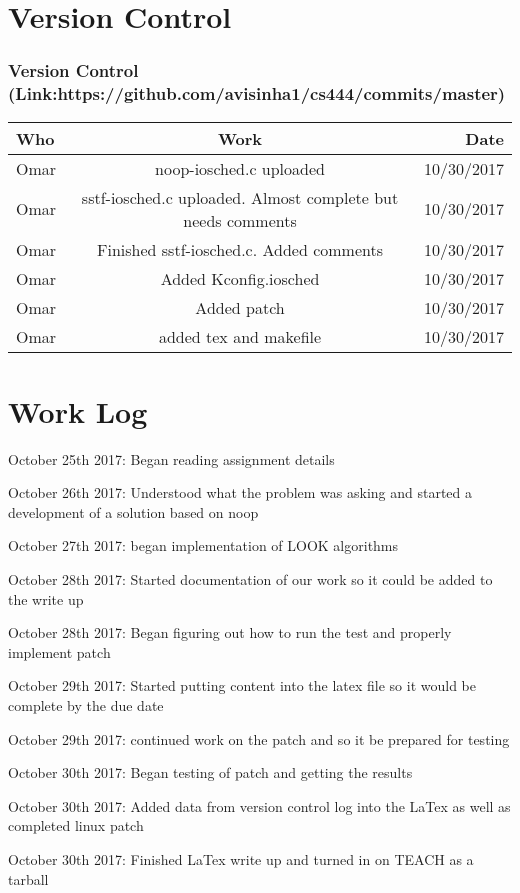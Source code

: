 \documentclass[onecolumn, draftclsnofoot,10pt, compsoc]{IEEEtran}
\begin{document}
\section{Version Control}
\subsubsection{Version Control (Link:https://github.com/avisinha1/cs444/commits/master)}
\begin{center}
	\begin{tabular}{ | l | c | r|}
		\hline
		Who & Work & Date \\
		\hline
		Omar & noop-iosched.c uploaded & 10/30/2017\\
		\hline
		Omar & sstf-iosched.c uploaded. Almost complete but needs comments & 10/30/2017\\
		\hline
		Omar & Finished sstf-iosched.c. Added comments & 10/30/2017 \\
		\hline
		Omar & Added Kconfig.iosched & 10/30/2017 \\
		\hline
		Omar & Added patch & 10/30/2017 \\
		\hline
		Omar & added tex and makefile & 10/30/2017\\
		\hline
	\end{tabular}
\end{center}	
	
	


\section{Work Log}

	October 25th 2017: Began reading assignment details 
	
	October 26th 2017: Understood what the problem was asking and started a development of a solution based on noop
	
	October 27th 2017: began implementation of LOOK algorithms
	
	October 28th 2017: Started documentation of our work so it could be added to the write up
	
	October 28th 2017: Began figuring out how to run the test and properly implement patch
	
	October 29th 2017: Started putting content into the latex file so it would be complete by the due date
	
	October 29th 2017: continued work on the patch and so it be prepared for testing
	
	October 30th 2017: Began testing of patch and getting the results
	
	October 30th 2017: Added data from version control log into the LaTex as well as completed linux patch
	
	October 30th 2017: Finished LaTex write up and turned in on TEACH as a tarball
	
	
\end{document}
